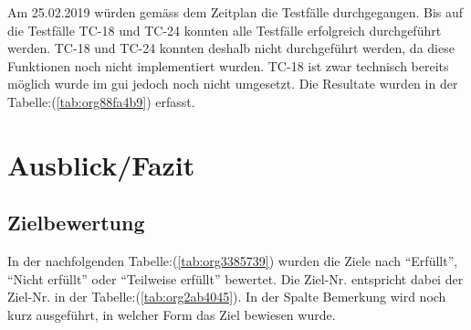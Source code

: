 Am 25.02.2019 würden gemäss dem Zeitplan die Testfälle durchgegangen. Bis auf
die Testfälle TC-18 und TC-24 konnten alle Testfälle erfolgreich durchgeführt
werden. TC-18 und TC-24 konnten deshalb nicht durchgeführt werden, da diese
Funktionen noch nicht implementiert wurden. TC-18 ist zwar technisch bereits
möglich wurde im \gls{gui} jedoch noch nicht umgesetzt. Die Resultate wurden in
der Tabelle:(\ref{tab:org88fa4b9}) erfasst.

\cleardoublepage
\section{Ausblick/Fazit}
\label{sec:org859a9c9}
\subsection{Zielbewertung}
\label{sec:orge97ea77}

In der nachfolgenden Tabelle:(\ref{tab:org3385739}) wurden die Ziele nach
"`Erfüllt"', "`Nicht erfüllt"' oder "`Teilweise erfüllt"' bewertet. Die Ziel-Nr.
entspricht dabei der Ziel-Nr. in der Tabelle:(\ref{tab:org2ab4045}). In der Spalte
Bemerkung wird noch kurz ausgeführt, in welcher Form das Ziel bewiesen wurde.

